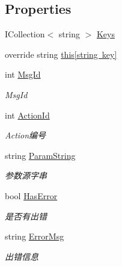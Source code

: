 \subsection*{Properties}
\begin{DoxyCompactItemize}
\item 
I\+Collection$<$ string $>$ \mbox{\hyperlink{class_t_net_1_1_contract_1_1_http_get_a5a649272bfdf55f4aba9350b44af3470}{Keys}}
\item 
override string \mbox{\hyperlink{class_t_net_1_1_contract_1_1_http_get_af498fc013a85b2df9400eb8846a9b079}{this\mbox{[}string key\mbox{]}}}
\item 
int \mbox{\hyperlink{class_t_net_1_1_contract_1_1_http_get_a5db5264886a4573060b2200c8eadb2b4}{Msg\+Id}}
\begin{DoxyCompactList}\small\item\em Msg\+Id \end{DoxyCompactList}\item 
int \mbox{\hyperlink{class_t_net_1_1_contract_1_1_http_get_a9a7244b723f28159e3166129c3f11cbf}{Action\+Id}}
\begin{DoxyCompactList}\small\item\em Action编号 \end{DoxyCompactList}\item 
string \mbox{\hyperlink{class_t_net_1_1_contract_1_1_http_get_a88684c94f76735f0c31ad7ddc177df16}{Param\+String}}
\begin{DoxyCompactList}\small\item\em 参数源字串 \end{DoxyCompactList}\item 
bool \mbox{\hyperlink{class_t_net_1_1_contract_1_1_http_get_acf34bed8e7c856b53675d62f95449502}{Has\+Error}}
\begin{DoxyCompactList}\small\item\em 是否有出错 \end{DoxyCompactList}\item 
string \mbox{\hyperlink{class_t_net_1_1_contract_1_1_http_get_a85ff13bdba29bd90ffb03b764f2926c9}{Error\+Msg}}
\begin{DoxyCompactList}\small\item\em 出错信息 \end{DoxyCompactList}\end{DoxyCompactItemize}

